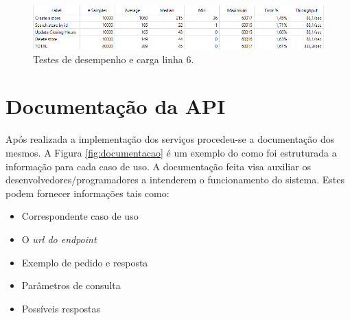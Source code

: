 \begin{figure}[H]
	\centering
	\includegraphics[scale=0.7]{figures/print6teste.png}
	\caption{Testes de desempenho e carga linha 6.}
	\label{fig:teste6}
\end{figure}

\section{Documentação da API}

Após realizada a implementação dos serviços procedeu-se a documentação dos mesmos. A Figura \ref{fig:documentacao} é um exemplo do como foi estruturada a informação para cada caso de uso. A documentação feita visa auxiliar os desenvolvedores/programadores a intenderem o funcionamento do sistema. Estes podem fornecer informações tais como:

\begin{itemize}
    \item Correspondente caso de uso
    \item O \textit{url do endpoint}
    \item Exemplo de pedido e resposta
    \item Parâmetros de consulta
    \item Possíveis respostas
\end{itemize}

